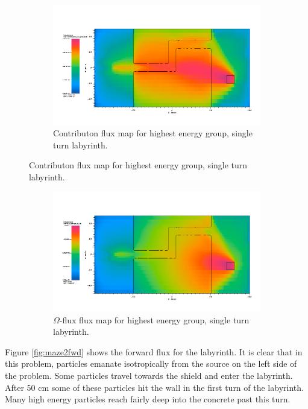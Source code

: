 \begin{figure}[htb!]\ContinuedFloat
  \centering
  \begin{subfigure}[t]{\textwidth}
    \includegraphics[width=0.9\linewidth]{./chapters/characterization_probs/figures/char/maze2/maze2McontribG00.png}
    \caption{Contributon flux map for highest energy group, single turn
    labyrinth.}
    \label{fig:maze2contrib}
  \end{subfigure}
\end{figure}
\begin{figure}[htb!]\ContinuedFloat
  \centering
  \begin{subfigure}[t]{\textwidth}
    \includegraphics[width=0.9\linewidth]{./chapters/characterization_probs/figures/char/maze2/maze2MomegaG00.png}
    \caption{$\Omega$-flux flux map for highest energy group, single turn
    labyrinth.}
    \label{fig:maze2omega}
  \end{subfigure}
  \caption[Flux map slice of single turn labyrinth.]{}
  \label{fig:maze2fluxmaps}
\end{figure}

Figure \ref{fig:maze2fwd} shows the forward flux for the labyrinth. It is
clear that in this problem, particles emanate isotropically from the
source on the left side of the problem. Some particles travel towards the
shield and enter the labyrinth. After 50 cm some of these particles hit the wall in
the first turn of the labyrinth. Many high energy particles reach fairly deep
into the concrete past this turn.

